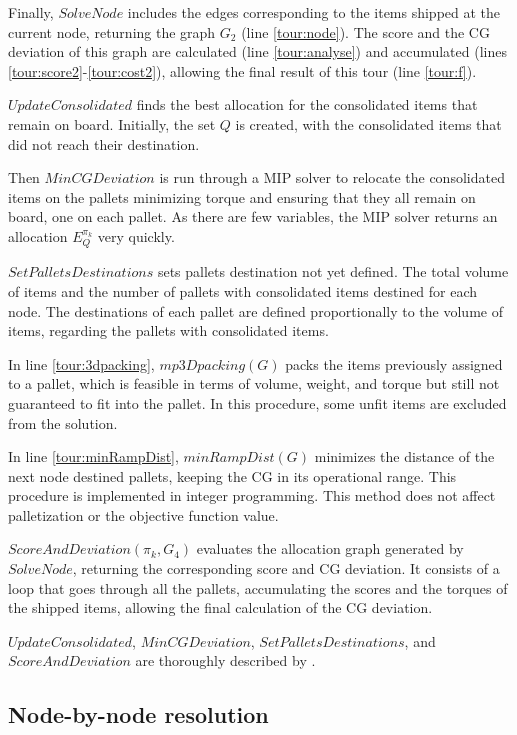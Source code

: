\documentclass[preprint,authoryear]{elsarticle}
\begin{document}
Finally, $SolveNode$\/ includes the edges corresponding to the items shipped at the current node, returning the graph $G_2$\/ (line \ref{tour:node}). The score and the CG deviation of this graph are calculated (line \ref{tour:analyse}) and accumulated (lines \ref{tour:score2}-\ref{tour:cost2}), allowing the final result of this tour (line \ref{tour:f}).

$UpdateConsolidated$ finds the best allocation for the consolidated items that remain on board. Initially, the set $Q$ is created, with the consolidated items that did not reach their destination.

Then $MinCGDeviation$ is run through a MIP solver to relocate the consolidated items on the pallets minimizing torque and ensuring that they all remain on board, one on each pallet. As there are few variables, the MIP solver returns an allocation $E_Q^{\pi_k}$ very quickly.

$SetPalletsDestinations$ sets pallets destination not yet defined. The total volume of items and the number of pallets with consolidated items destined for each node. The destinations of each pallet are defined proportionally to the volume of items, regarding the pallets with consolidated items.

{\color{purple}
In line \ref{tour:3dpacking}, $mp3Dpacking(G)$ packs the items previously assigned to a pallet, which is feasible in terms of volume, weight, and torque but still not guaranteed to fit into the pallet. In this procedure, some unfit items are excluded from the solution.
}

{\color{blue}
In line \ref{tour:minRampDist}, $minRampDist(G)$ minimizes the distance of the next node destined pallets, keeping the CG in its operational range. This procedure is implemented in integer programming. This method does not affect palletization or the objective function value.
}

$ScoreAndDeviation(\pi_k, G_4)$ evaluates the allocation graph generated by $SolveNode$, returning the corresponding score and CG deviation. It consists of a loop that goes through all the pallets, accumulating the scores and the torques of the shipped items, allowing the final calculation of the CG deviation.

$UpdateConsolidated$, $MinCGDeviation$, $SetPalletsDestinations$, and $ScoreAndDeviation$ are thoroughly described by \cite{MesquitaSanches2023}.


\subsection{Node-by-node resolution}
\label{methods}
\end{document}

